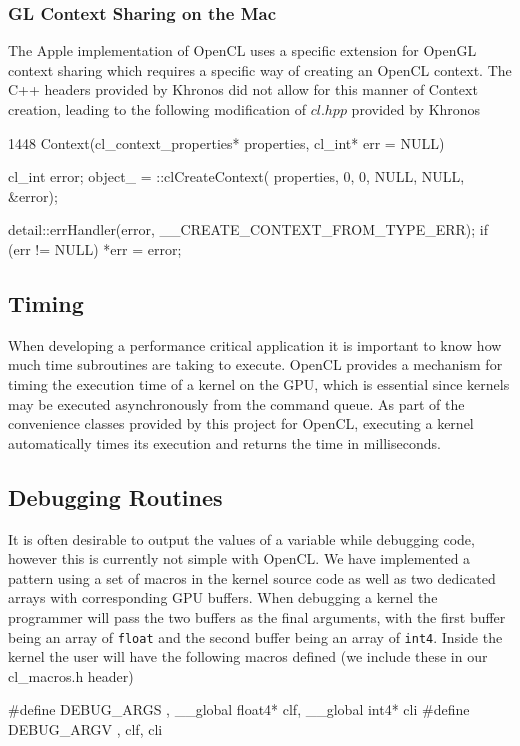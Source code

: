 \subsubsection{GL Context Sharing on the Mac}
The Apple implementation of OpenCL uses a specific extension for OpenGL context
sharing which requires a specific way of creating an OpenCL context. The C++
headers provided by Khronos did not allow for this manner of Context creation,
leading to the following modification of $cl.hpp$ provided by Khronos
\begin{cppcode}{1448}
Context(cl_context_properties* properties, cl_int* err = NULL)
    {    
        cl_int error;
        object_ = ::clCreateContext(
            properties, 0, 
            0,   
            NULL, NULL, &error);

        detail::errHandler(error, __CREATE_CONTEXT_FROM_TYPE_ERR);
        if (err != NULL) {
            *err = error;
        }    

    }    
\end{cppcode}

\subsection{Timing}

When developing a performance critical application it is important to know how
much time subroutines are taking to execute. OpenCL provides a mechanism for
timing the execution time of a kernel on the GPU, which is essential since
kernels may be executed asynchronously from the command queue. As part of the
convenience classes provided by this project for OpenCL, executing a kernel
automatically times its execution and returns the time in milliseconds.




\subsection{Debugging Routines}

It is often desirable to output the values of a variable while debugging code,
however this is currently not simple with OpenCL. We have implemented a pattern
using a set of macros in the kernel source code as well as two dedicated arrays
with corresponding GPU buffers. When debugging a kernel the programmer will
pass the two buffers as the final arguments, with the first buffer being an
array of \verb|float| and the second buffer being an array of \verb|int4|. 
Inside the kernel the user will have the following macros defined (we include
these in our cl\_macros.h header)
\begin{cppcode}{0}
#define DEBUG_ARGS  , __global float4* clf, __global int4* cli
#define DEBUG_ARGV  , clf, cli
\end{cppcode}

